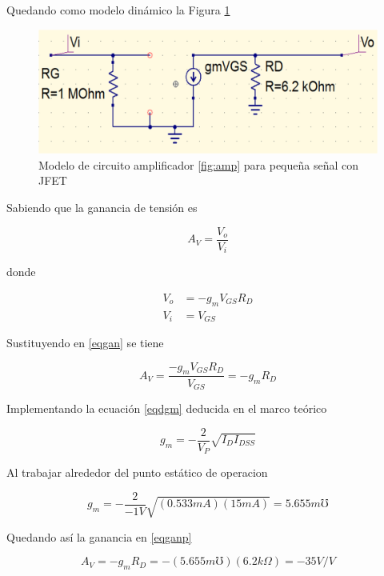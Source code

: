 \documentclass[12pt, a4paper]{article}
\begin{document}
    Quedando como modelo dinámico la Figura \ref{fig:din}

    \begin{figure}[h!]
        \centering
        \includegraphics[width=15cm\textwidth]{dinamico.png}
        \caption{Modelo de circuito amplificador \ref{fig:amp} para pequeña señal con JFET}
        \label{fig:din}
    \end{figure}

    Sabiendo que la ganancia de tensión es

    \begin{equation} \label{eqgan}
        A_V = \frac{V_o}{V_i}
    \end{equation}

    donde

    \begin{equation*}
        \begin{split}
            V_o & = -g_mV_{GS}R_D \\
            V_i & = V_{GS}
        \end{split}
    \end{equation*}

    Sustituyendo en \eqref{eqgan} se tiene

    \begin{equation} \label{eqganp}
        A_V = \frac{-g_mV_{GS}R_D}{V_{GS}} = -g_mR_D
    \end{equation}

    Implementando la ecuación \eqref{eqdgm} deducida en el marco teórico

    $$g_m = -\frac{2}{V_P}\sqrt{I_DI_{DSS}}$$

    Al trabajar alrededor del punto estático de operacion

    $$g_m = -\frac{2}{-1V}\sqrt{(0.533mA)(15mA)} = 5.655 m\mho$$

    Quedando así la ganancia en \eqref{eqganp}

    \begin{equation} \label{eqAvt}
        A_V = -g_mR_D = -(5.655 m\mho)(6.2 k\Omega) = -35 V/V
    \end{equation}
\end{document}
